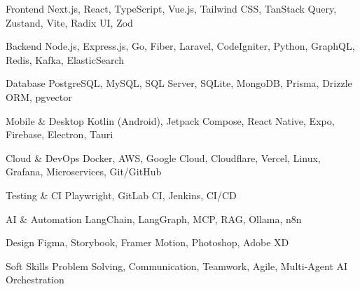 

\begin{cvskills}

  \cvskill
    {Frontend} %
    {Next.js, React, TypeScript, Vue.js, Tailwind CSS, TanStack Query, Zustand, Vite, Radix UI, Zod} %

  \cvskill
    {Backend} %
    {Node.js, Express.js, Go, Fiber, Laravel, CodeIgniter, Python, GraphQL, Redis, Kafka, ElasticSearch} %

  \cvskill
    {Database} %
    {PostgreSQL, MySQL, SQL Server, SQLite, MongoDB, Prisma, Drizzle ORM, pgvector} %

  \cvskill
    {Mobile \& Desktop} %
    {Kotlin (Android), Jetpack Compose, React Native, Expo, Firebase, Electron, Tauri} %

  \cvskill
    {Cloud \& DevOps} %
    {Docker, AWS, Google Cloud, Cloudflare, Vercel, Linux, Grafana, Microservices, Git/GitHub} %

  \cvskill
    {Testing \& CI} %
    {Playwright, GitLab CI, Jenkins, CI/CD} %

  \cvskill
    {AI \& Automation} %
    {LangChain, LangGraph, MCP, RAG, Ollama, n8n} %

  \cvskill
    {Design} %
    {Figma, Storybook, Framer Motion, Photoshop, Adobe XD} %

  \cvskill
    {Soft Skills} %
    {Problem Solving, Communication, Teamwork, Agile, Multi-Agent AI Orchestration} %


\end{cvskills}
